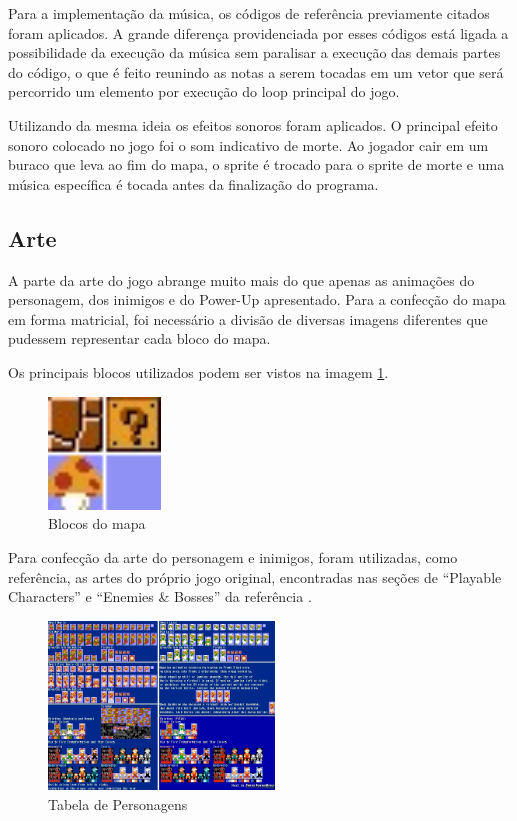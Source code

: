 \documentclass[11pt, twocolumn]{extarticle}
\begin{document}
Para a implementação da música, os códigos de referência previamente citados foram aplicados. A grande diferença providenciada por esses códigos está ligada a possibilidade da execução da música sem paralisar a execução das demais partes do código, o que é feito reunindo as notas a serem tocadas em um vetor que será percorrido um elemento por execução do loop principal do jogo.

Utilizando da mesma ideia os efeitos sonoros foram aplicados. O principal efeito sonoro colocado no jogo foi o som indicativo de morte. Ao jogador cair em um buraco que leva ao fim do mapa, o sprite é trocado para o sprite de morte e uma música específica é tocada antes da finalização do programa.

\subsection{Arte}
\label{Artes}
\indent \indent A parte da arte do jogo abrange muito mais do que apenas as animações do personagem, dos inimigos e do Power-Up apresentado. Para a confecção do mapa em forma matricial, foi necessário a divisão de diversas imagens diferentes que pudessem representar cada bloco do mapa.

Os principais blocos utilizados podem ser vistos na imagem \ref{image: Blocos do mapa}.

\begin{figure}[H]
	\centering
	\includegraphics[width=3cm]{figuras/Blocos.png}
	\caption{Blocos do mapa}
	\label{image: Blocos do mapa}
\end{figure}

Para confecção da arte do personagem e inimigos, foram utilizadas, como referência, as artes do próprio jogo original, encontradas nas seções de “Playable Characters” e “Enemies \& Bosses” da referência \cite{Sprites}. 

\begin{figure}[H]
	\centering
	\includegraphics[width=6cm]{figuras/Personagens1.jpeg}
	\caption{Tabela de Personagens}
	\label{image: Tabela de Personagens1}
\end{figure}
\end{document}
